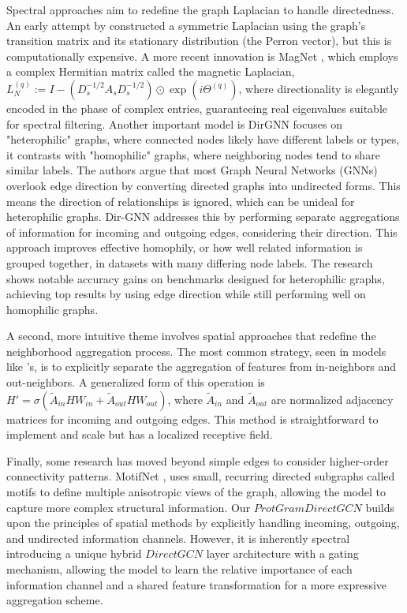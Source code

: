 \documentclass[utf8]{frontiers_suppmat}
\begin{document}
	Spectral approaches aim to redefine the graph Laplacian to handle directedness. An early attempt by \cite{ma_spectralbasedgraphconvolutional_2019} constructed a symmetric Laplacian using the graph's transition matrix and its stationary distribution (the Perron vector), but this is computationally expensive. A more recent innovation is MagNet \cite{zhang_magnetneuralnetwork_2021}, which employs a complex Hermitian matrix called the magnetic Laplacian, $L_{N}^{(q)}:=I-(D_{s}^{-1/2}A_{s}D_{s}^{-1/2})\odot \exp(i\Theta^{(q)})$, where directionality is elegantly encoded in the phase of complex entries, guaranteeing real eigenvalues suitable for spectral filtering. Another important model is DirGNN \cite{rossi_edgedirectionalityimproves_2023} focuses on "heterophilic" graphs, where connected nodes likely have different labels or types, it contrasts with "homophilic" graphs, where neighboring nodes tend to share similar labels. The authors argue that most Graph Neural Networks (GNNs) overlook edge direction by converting directed graphs into undirected forms. This means the direction of relationships is ignored, which can be unideal for heterophilic graphs. Dir-GNN addresses this by performing separate aggregations of information for incoming and outgoing edges, considering their direction. This approach improves effective homophily, or how well related information is grouped together, in datasets with many differing node labels. The research shows notable accuracy gains on benchmarks designed for heterophilic graphs, achieving top results by using edge direction while still performing well on homophilic graphs.
	
	A second, more intuitive theme involves spatial approaches that redefine the neighborhood aggregation process. The most common strategy, seen in models like \cite{tong_digraphinceptionconvolutional_2020}'s, is to explicitly separate the aggregation of features from in-neighbors and out-neighbors. A generalized form of this operation is $H' = \sigma ( \tilde{A}_{in} H W_{in} + \tilde{A}_{out} H W_{out} )$, where $\tilde{A}_{in}$ and $\tilde{A}_{out}$ are normalized adjacency matrices for incoming and outgoing edges. This method is straightforward to implement and scale but has a localized receptive field.
	
	Finally, some research has moved beyond simple edges to consider higher-order connectivity patterns. MotifNet \cite{monti_motifnetmotifbasedgraph_2018}, uses small, recurring directed subgraphs called motifs to define multiple anisotropic views of the graph, allowing the model to capture more complex structural information. Our $ProtGramDirectGCN$ builds upon the principles of spatial methods by explicitly handling incoming, outgoing, and undirected information channels. However, it is inherently spectral introducing a unique hybrid $DirectGCN$ layer architecture with a gating mechanism, allowing the model to learn the relative importance of each information channel and a shared feature transformation for a more expressive aggregation scheme.
	
\end{document}
